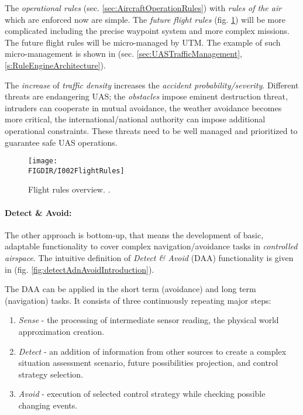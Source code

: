 The \emph{operational rules} (sec. \ref{sec:AircraftOperationRules}) with \emph{rules of the air} \cite{icaoAnnex2} which are enforced now are simple. The \emph{future flight rules} (fig. \ref{fig:flightRulesIntro}) will be more complicated including the precise waypoint system and more complex missions. The future flight rules will be micro-managed by UTM. The example of such micro-management is shown in (sec. \ref{sec:UASTrafficManagement}, \ref{s:RuleEngineArchitecture}). 

The \emph{increase} of \emph{traffic density} increases the \emph{accident probability/severity}.  Different threats are endangering UAS; the \emph{obstacles} impose eminent destruction threat, intruders can cooperate in mutual avoidance, the weather avoidance becomes more critical, the international/national authority can impose additional operational constraints. These threats need to be well managed and prioritized to guarantee safe UAS operations.

\begin{figure}[H]
    \centering
    \texttt{[image: \\FIGDIR/I002FlightRules]}
    \caption{Flight rules overview. \cite{airbusUTM2018blueprint}.}
    \label{fig:flightRulesIntro}
\end{figure}

\paragraph{Detect \& Avoid:} The other approach is bottom-up, that means the development of basic, adaptable functionality to cover complex navigation/avoidance tasks in \emph{controlled airspace}. The intuitive definition of \emph{Detect \& Avoid} (DAA) functionality is given in (fig. \ref{fig:detectAdnAvoidIntroduction}).


\noindent The DAA can be applied in the short term (avoidance) and long term (navigation) tasks. It consists of three continuously repeating major steps:
\begin{enumerate}
    \item \emph{Sense} - the processing of intermediate sensor reading, the physical world approximation creation.
    
    \item \emph{Detect} - an addition of information from other sources to create a complex situation assessment scenario, future possibilities projection, and control strategy selection.
    
    \item \emph{Avoid} - execution of selected control strategy while checking possible changing events.
\end{enumerate}


